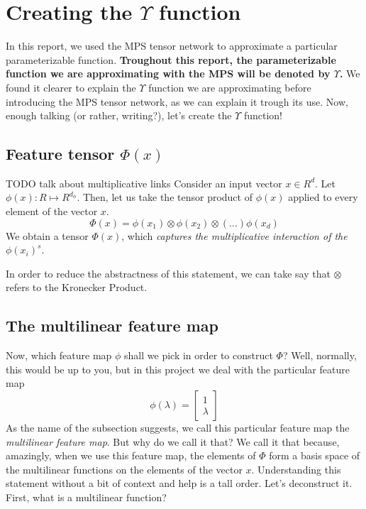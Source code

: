 \documentclass{article}
\theoremstyle{definition}
\theoremstyle{definition}
\begin{document}
\section{Creating the $\Upsilon$ function}
In this report, we used the MPS tensor network to approximate a particular parameterizable function.
{\bf Troughout this report, the parameterizable function we are approximating with the MPS will be denoted by $\Upsilon$. }
We found it clearer to explain the $\Upsilon$ function we are approximating before introducing the MPS tensor network, as we can explain it trough its use.
Now, enough talking (or rather, writing?), let's create the $\Upsilon$ function!

\subsection{Feature tensor $\Phi(x)$}
TODO talk about multiplicative links
Consider an input vector $x \in R^d$. Let $\phi(x) : R \mapsto R^{d_{\phi}}$.  
Then, let us take the tensor product of $\phi(x)$ applied to every element of the vector $x$.
\begin{equation}
    \Phi(x) = \phi(x_1) \otimes  \phi(x_2) 
                \otimes (\dots) \phi(x_d)
\end{equation}
We obtain a tensor $\Phi(x)$, which \emph{captures the multiplicative interaction of the $\phi(x_i)^s$}.

In order to reduce the abstractness of this statement, we can take say that $\otimes$ refers to the Kronecker Product.

\subsection{The multilinear feature map}
Now, which feature map $\phi$ shall we pick in order to construct $\Phi$?
Well, normally, this would be up to you, but in this project we deal with the particular feature map
\begin{equation}
    \phi(\lambda) = 
    \begin{bmatrix}
        1 \\
        \lambda
    \end{bmatrix}
\end{equation}
As the name of the subsection suggests, we call this particular feature map the \emph{multilinear feature map}.
But why do we call it that?
We call it that because, amazingly, when we use this feature map, the elements of $\Phi$ form a basis space of the multilinear functions on the elements of the vector $x$.
Understanding this statement without a bit of context and help is a tall order. Let's deconstruct it.
First, what is a multilinear function?
\end{document}
